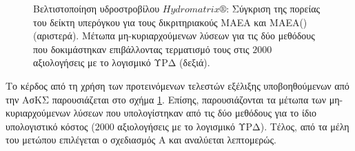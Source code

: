 \begin{figure}[h!]
\begin{minipage}[b]{0.5\linewidth}
 \centering
\end{minipage}
\begin{minipage}[b]{0.5\linewidth}
 \centering
\end{minipage}
\caption{Βελτιστοποίηση  υδροστροβίλου $Hydromatrix\circledR$: Σύγκριση της πορείας του δείκτη υπερόγκου για τους δικριτηριακούς ΜΑΕΑ και ΜΑΕΑ() (αριστερά). Μέτωπα μη-κυριαρχούμενων λύσεων για τις δύο μεθόδους που δοκιμάστηκαν επιβάλλοντας τερματισμό τους στις $2000$ αξιολογήσεις με το λογισμικό ΥΡΔ (δεξιά).}
\label{Matrix-Res}
\end{figure}

Το κέρδος από τη χρήση των προτεινόμενων τελεστών εξέλιξης υποβοηθούμενων από την ΑσΚΣ παρουσιάζεται στο σχήμα \ref{Matrix-Res}. Επίσης, παρουσιάζονται τα μέτωπα των μη-κυριαρχούμενων λύσεων που υπολογίστηκαν από τις δύο μεθόδους για το ίδιο υπολογιστικό κόστος ($2000$ αξιολογήσεις με το λογισμικό ΥΡΔ). Τέλος, από τα μέλη του μετώπου  επιλέγεται ο σχεδιασμός Α και αναλύεται λεπτομερώς.  

